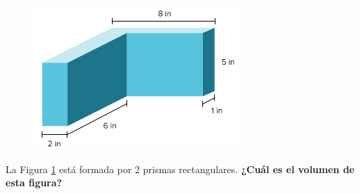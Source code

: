 \begin{multicols}{2}
    \begin{figure}[H]
        \centering
        \includegraphics[width=0.5\linewidth]{../images/20230316213725}
        \caption{}
        \label{fig:20230316213725}
    \end{figure}
    \columnbreak
    \question[10] La Figura \ref{fig:20230316213725} está formada por 2 prismas rectangulares.
    \textbf{¿Cuál es el volumen de esta figura?}
\end{multicols}
